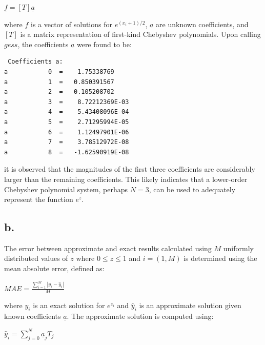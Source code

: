 \documentclass{report}
\begin{document}
	\begin{center}

		$\underline{f} = [T]\underline{a}$

	\end{center}

	\noindent where $\underline{f}$ is a vector of solutions for $e^{(x_i+1) / 2}$, $\underline{a}$ are unknown coefficients, and $[T]$ is a matrix representation of first-kind Chebyshev polynomials. Upon calling $gess$, the coefficients $\underline{a}$ were found to be:
	
	\begin{lstlisting}
 Coefficients a:
a           0  =    1.75338769    
a           1  =   0.850391567    
a           2  =   0.105208702    
a           3  =    8.72212369E-03
a           4  =    5.43408096E-04
a           5  =    2.71295994E-05
a           6  =    1.12497901E-06
a           7  =    3.78512972E-08
a           8  =   -1.62590919E-08
	\end{lstlisting}

	\noindent it is observed that the magnitudes of the first three coefficients are considerably larger than the remaining coefficients. This likely indicates that a lower-order Chebyshev polynomial system, perhaps $N = 3$, can be used to adequately represent the function $e^z$.
	
\subsection*{b.}

	The error between approximate and exact results calculated using $M$ uniformly distributed values of $z$ where $0 \leq z \leq 1$ and $i = (1, M)$ is determined using the mean absolute error, defined as:
	
	\begin{center}

	$MAE = \frac{\sum_{i=1}^{M} | y_i - \hat{y}_i |}{M}$

	\end{center}

	\noindent where $y_i$ is an exact solution for $e^{z_i}$ and $\hat{y}_i$ is an approximate solution given known coefficients $\underline{a}$. The approximate solution is computed using:
	
	\begin{center}
		
		$\hat{y}_i = \sum_{j=0}^{N}\underline{a}_j T_j $
		
	\end{center}
\end{document}

